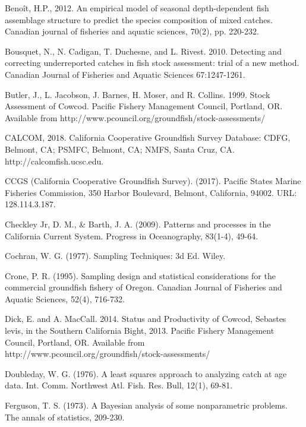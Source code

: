 \documentclass[12pt]{article}
\begin{document}
%
\begin{thebibliography}{1}
%
 Benoît, H.P., 2012. An empirical model of seasonal 
depth-dependent fish assemblage structure to predict the species composition 
of mixed catches.  Canadian journal of fisheries and aquatic sciences, 70(2), 
pp. 220-232.

%
 Bousquet, N., N. Cadigan, T. Duchesne, and L. Rivest. 
2010. Detecting and correcting underreported catches in fish stock assessment: 
trial of a new method. Canadian Journal of Fisheries and Aquatic Sciences 
67:1247-1261.

%
 Butler, J., L. Jacobson, J. Barnes, H. Moser, and R. Collins. 1999. 
Stock Assessment of Cowcod. Pacific Fishery Management Council, Portland, OR. 
Available from http://www.pcouncil.org/groundfish/stock-assessments/

%
 CALCOM, 2018. California Cooperative Groundfish Survey 
Database: CDFG, Belmont, CA; PSMFC, Belmont, CA; NMFS, Santa Cruz, CA. 
http://calcomfish.ucsc.edu.

%
 CCGS (California Cooperative Groundfish Survey). (2017). 
Pacific States Marine Fisheries Commission, 350 Harbor Boulevard, Belmont, 
California, 94002. URL:  128.114.3.187.

%
 Checkley Jr, D. M., \& Barth, J. A. (2009). Patterns and processes in 
the California Current System. Progress in Oceanography, 83(1-4), 49-64.

%
 Cochran, W. G. (1977). Sampling Techniques: 3d Ed. Wiley.

%
 Crone, P. R. (1995). Sampling design and statistical 
considerations for the commercial groundfish fishery of Oregon. Canadian 
Journal of Fisheries and Aquatic Sciences, 52(4), 716-732.

%
 Dick, E. and A. MacCall. 2014. Status and Productivity of 
Cowcod, Sebastes levis, in the Southern California Bight, 2013. Pacific 
Fishery Management Council, Portland, OR. Available from 
http://www.pcouncil.org/groundfish/stock-assessments/

%
 Doubleday, W. G. (1976). A least squares approach to 
analyzing catch at age data. Int. Comm. Northwest Atl. Fish. Res. Bull, 12(1), 
69-81.

%
 Ferguson, T. S. (1973). A Bayesian analysis of some nonparametric 
problems. The annals of statistics, 209-230.


\end{thebibliography}
\end{document}
